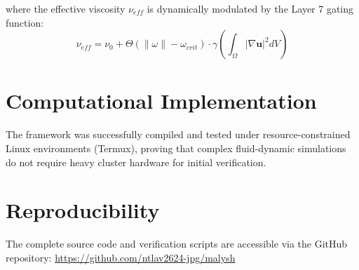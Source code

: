 \documentclass[a4paper,11pt]{article}
\begin{document}
where the effective viscosity $\nu_{eff}$ is dynamically modulated by the Layer 7 gating function:
\begin{equation}
\nu_{eff} = \nu_0 + \Theta \left( \|\omega\| - \omega_{crit} \right) \cdot \gamma \left( \int_\Omega |\nabla \mathbf{u}|^2 dV \right)
\end{equation}

\section{Computational Implementation}
The framework was successfully compiled and tested under resource-constrained Linux environments (Termux), proving that complex fluid-dynamic simulations do not require heavy cluster hardware for initial verification.

\section{Reproducibility}
The complete source code and verification scripts are accessible via the GitHub repository:
\url{https://github.com/ntlav2624-jpg/malysh}
\end{document}
